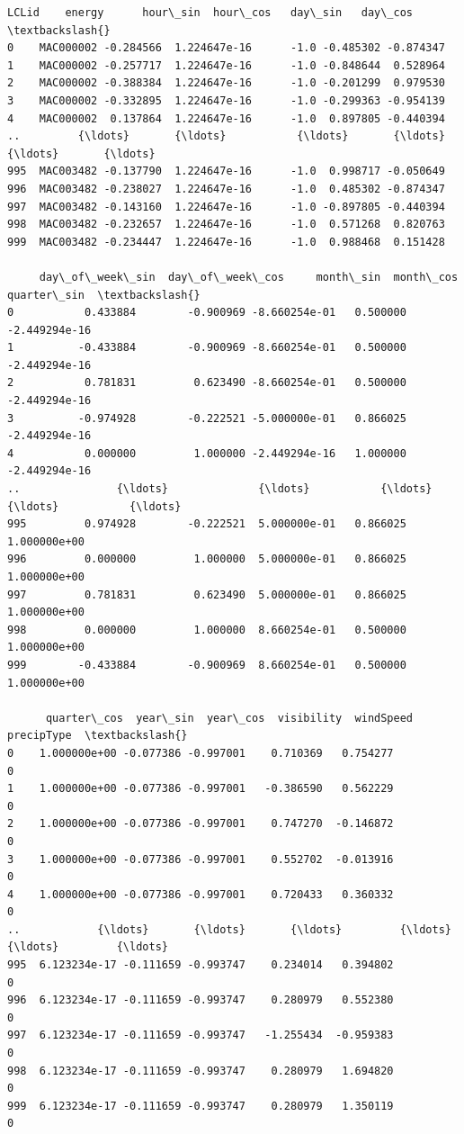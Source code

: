 \documentclass[11pt]{article}
\makeatletter
\newcommand{\boxspacing}{\kern\kvtcb@left@rule\kern\kvtcb@boxsep}
\newcommand{\prompt}[4]{
        {\ttfamily\llap{{\color{#2}[#3]:\hspace{3pt}#4}}\vspace{-\baselineskip}}
    }
\makeatother
\begin{document}
            \begin{tcolorbox}[breakable, size=fbox, boxrule=.5pt, pad at break*=1mm, opacityfill=0]
\prompt{Out}{outcolor}{176}{\boxspacing}
\begin{Verbatim}[commandchars=\\\{\}]
         LCLid    energy      hour\_sin  hour\_cos   day\_sin   day\_cos  \textbackslash{}
0    MAC000002 -0.284566  1.224647e-16      -1.0 -0.485302 -0.874347
1    MAC000002 -0.257717  1.224647e-16      -1.0 -0.848644  0.528964
2    MAC000002 -0.388384  1.224647e-16      -1.0 -0.201299  0.979530
3    MAC000002 -0.332895  1.224647e-16      -1.0 -0.299363 -0.954139
4    MAC000002  0.137864  1.224647e-16      -1.0  0.897805 -0.440394
..         {\ldots}       {\ldots}           {\ldots}       {\ldots}       {\ldots}       {\ldots}
995  MAC003482 -0.137790  1.224647e-16      -1.0  0.998717 -0.050649
996  MAC003482 -0.238027  1.224647e-16      -1.0  0.485302 -0.874347
997  MAC003482 -0.143160  1.224647e-16      -1.0 -0.897805 -0.440394
998  MAC003482 -0.232657  1.224647e-16      -1.0  0.571268  0.820763
999  MAC003482 -0.234447  1.224647e-16      -1.0  0.988468  0.151428

     day\_of\_week\_sin  day\_of\_week\_cos     month\_sin  month\_cos   quarter\_sin  \textbackslash{}
0           0.433884        -0.900969 -8.660254e-01   0.500000 -2.449294e-16
1          -0.433884        -0.900969 -8.660254e-01   0.500000 -2.449294e-16
2           0.781831         0.623490 -8.660254e-01   0.500000 -2.449294e-16
3          -0.974928        -0.222521 -5.000000e-01   0.866025 -2.449294e-16
4           0.000000         1.000000 -2.449294e-16   1.000000 -2.449294e-16
..               {\ldots}              {\ldots}           {\ldots}        {\ldots}           {\ldots}
995         0.974928        -0.222521  5.000000e-01   0.866025  1.000000e+00
996         0.000000         1.000000  5.000000e-01   0.866025  1.000000e+00
997         0.781831         0.623490  5.000000e-01   0.866025  1.000000e+00
998         0.000000         1.000000  8.660254e-01   0.500000  1.000000e+00
999        -0.433884        -0.900969  8.660254e-01   0.500000  1.000000e+00

      quarter\_cos  year\_sin  year\_cos  visibility  windSpeed  precipType  \textbackslash{}
0    1.000000e+00 -0.077386 -0.997001    0.710369   0.754277           0
1    1.000000e+00 -0.077386 -0.997001   -0.386590   0.562229           0
2    1.000000e+00 -0.077386 -0.997001    0.747270  -0.146872           0
3    1.000000e+00 -0.077386 -0.997001    0.552702  -0.013916           0
4    1.000000e+00 -0.077386 -0.997001    0.720433   0.360332           0
..            {\ldots}       {\ldots}       {\ldots}         {\ldots}        {\ldots}         {\ldots}
995  6.123234e-17 -0.111659 -0.993747    0.234014   0.394802           0
996  6.123234e-17 -0.111659 -0.993747    0.280979   0.552380           0
997  6.123234e-17 -0.111659 -0.993747   -1.255434  -0.959383           0
998  6.123234e-17 -0.111659 -0.993747    0.280979   1.694820           0
999  6.123234e-17 -0.111659 -0.993747    0.280979   1.350119           0


\end{Verbatim}
\end{tcolorbox}
\end{document}
